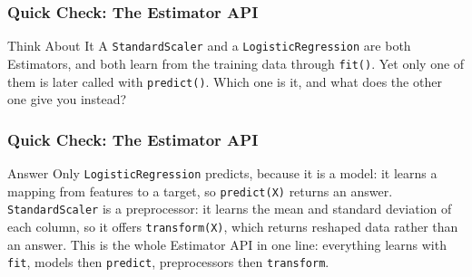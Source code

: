 \begin{frame}[fragile]\frametitle{Quick Check: The Estimator API}
\begin{block}{Think About It}
A \texttt{StandardScaler} and a \texttt{LogisticRegression} are both Estimators, and both learn from the training data through \texttt{fit()}. Yet only one of them is later called with \texttt{predict()}. Which one is it, and what does the other one give you instead?
\end{block}
\end{frame}

\begin{frame}[fragile]\frametitle{Quick Check: The Estimator API}
\begin{block}{Answer}
Only \texttt{LogisticRegression} predicts, because it is a model: it learns a mapping from features to a target, so \texttt{predict(X)} returns an answer. \texttt{StandardScaler} is a preprocessor: it learns the mean and standard deviation of each column, so it offers \texttt{transform(X)}, which returns reshaped data rather than an answer. This is the whole Estimator API in one line: everything learns with \texttt{fit}, models then \texttt{predict}, preprocessors then \texttt{transform}.
\end{block}
\end{frame}


